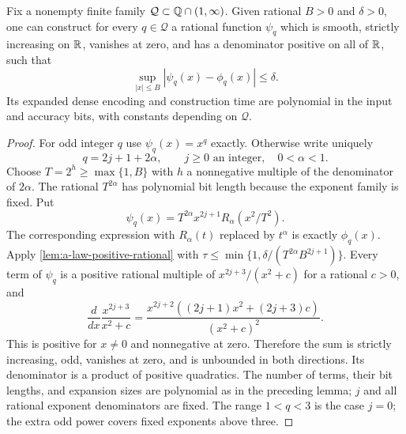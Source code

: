 \begin{lemma}
\label{lem:a-law-constitutive}
Fix a nonempty finite family $\mathcal Q\subset\mathbb{Q}\cap(1,\infty)$. Given rational
$B>0$ and $\delta>0$, one can construct for every $q\in\mathcal Q$ a
rational function $\psi_q$ which is smooth, strictly increasing on $\mathbb{R}$,
vanishes at zero, and has a denominator positive on all of $\mathbb{R}$, such that
\[
 \sup_{|x|\le B}|\psi_q(x)-\phi_q(x)|\le\delta.
\]
Its expanded dense encoding and construction time are polynomial in the
input and accuracy bits, with constants depending on $\mathcal Q$.
\end{lemma}
\begin{proof}
For odd integer $q$ use $\psi_q(x)=x^q$ exactly. Otherwise write uniquely
\[
 q=2j+1+2\alpha,\qquad j\ge0\text{ an integer},\quad0<\alpha<1.
\]
Choose $T=2^h\ge\max\{1,B\}$ with $h$ a nonnegative multiple of the
denominator of $2\alpha$. The rational $T^{2\alpha}$ has polynomial
bit length because the exponent family is fixed. Put
\[
 \psi_q(x)=T^{2\alpha}x^{2j+1}
                 R_\alpha(x^2/T^2).
\]
The corresponding expression with $R_\alpha(t)$ replaced by $t^\alpha$
is exactly $\phi_q(x)$. Apply \cref{lem:a-law-positive-rational} with
$\tau\le\min\{1,\delta/(T^{2\alpha}B^{2j+1})\}$.
Every term of $\psi_q$ is a positive rational multiple of
$x^{2j+3}/(x^2+c)$ for a rational $c>0$, and
\[
 \frac{d}{dx}\frac{x^{2j+3}}{x^2+c}
 =\frac{x^{2j+2}((2j+1)x^2+(2j+3)c)}{(x^2+c)^2}.
\]
This is positive for $x\ne0$ and nonnegative at zero. Therefore the sum
is strictly increasing, odd, vanishes at zero, and is unbounded in
both directions. Its denominator is a product of positive quadratics.
The number of terms, their bit lengths, and expansion sizes are polynomial
as in the preceding lemma; $j$ and all rational exponent denominators
are fixed. The range $1<q<3$ is the case $j=0$; the extra odd power
covers fixed exponents above three.
\end{proof}

